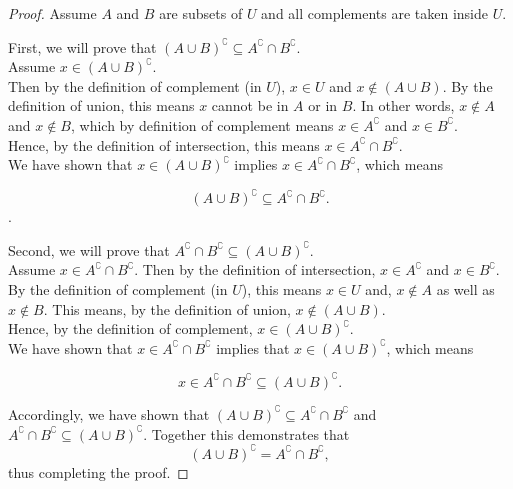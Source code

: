 \documentclass{amsart} %
\theoremstyle{definition} %
\theoremstyle{definition}
\theoremstyle{remark} %
\begin{document}
\begin{proof}
      Assume $A$ and $B$ are subsets of $U$ and all complements are taken inside $U$.

      First, we will prove that $(A \cup B)^\complement \subseteq A^\complement \cap B^\complement $. \\
      \indent Assume $x \in (A \cup B)^\complement$. \\
      \indent Then by the definition of complement (in $U$), $x \in U$ and $x \not\in (A \cup B) $. By the definition of union, this means $x$ cannot be in $A$ or in $B$. In other words, $x \not\in A$ and $x \not\in B$, which by definition of complement means $x \in A^\complement$ and $x \in B^\complement$. \\
      \indent Hence, by the definition of intersection, this means $x \in A^\complement \cap B^\complement$. \\
      \indent We have shown that $x \in (A \cup B)^\complement $ implies $x \in A^\complement \cap B^\complement$, which means

      $$(A \cup B)^\complement \subseteq A^\complement \cap B^\complement .$$.

      Second, we will prove that $A^\complement \cap B^\complement \subseteq (A \cup B)^\complement $. \\
      \indent Assume $x \in A^\complement \cap B^\complement$. Then by the definition of intersection, $x \in A^\complement$ and $x \in B^\complement$. \\
      \indent By the definition of complement (in $U$), this means $x \in U$ and, $x \not\in A$ as well as $x \not\in B$. This means, by the definition of union, $x \not\in (A \cup B)$.\\
      \indent Hence, by the definition of complement, $x \in (A \cup B)^\complement$. \\
      \indent We have shown that $x \in A^\complement \cap B^\complement$ implies that $x \in (A \cup B)^\complement$, which means

      $$x \in A^\complement \cap B^\complement \subseteq (A \cup B)^\complement .$$

      Accordingly, we have shown that $(A \cup B)^\complement \subseteq A^\complement \cap B^\complement$ and $A^\complement \cap B^\complement \subseteq (A \cup B)^\complement$. Together this demonstrates that
      $$(A \cup B)^\complement = A^\complement \cap B^\complement ,$$
      thus completing the proof.
\end{proof}
\end{document}
